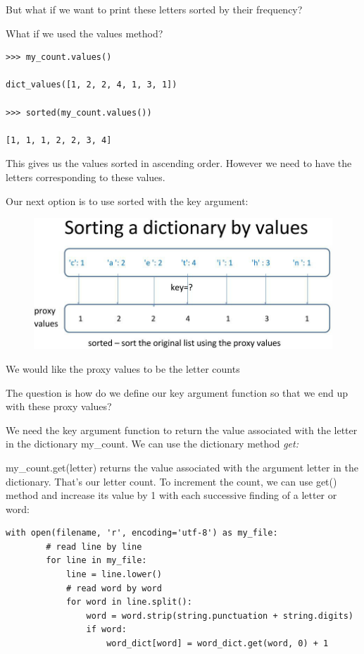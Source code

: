 \documentclass{article}
\begin{document}
But what if we want to print these letters sorted by their frequency?  

What if we used the values method?

\begin{lstlisting}
>>> my_count.values()

dict_values([1, 2, 2, 4, 1, 3, 1])

>>> sorted(my_count.values())

[1, 1, 1, 2, 2, 3, 4]
\end{lstlisting}

This gives us the values sorted in ascending order.  However we need to have the letters corresponding to these values.

Our next option is to use sorted with the key argument:

\begin{figure}[h]
\includegraphics[scale=.37]{sortingbyvalue}\\
\end{figure}

We would like  the proxy values to be the letter counts

The question is how do we define our key argument function so that we end up with these proxy values?

We need the key argument function to return the value associated with the letter in the dictionary my{\_}count.  We can use the dictionary method \textit{get:}

my{\_}count.get(letter) returns the value associated with the argument letter in the dictionary. That's our letter count. To increment the count, we can use get() method and increase its value by 1 with each successive finding of a letter or word:

\begin{lstlisting}
with open(filename, 'r', encoding='utf-8') as my_file:
        # read line by line
        for line in my_file:
            line = line.lower()
            # read word by word
            for word in line.split():
                word = word.strip(string.punctuation + string.digits)
                if word:
                    word_dict[word] = word_dict.get(word, 0) + 1
\end{lstlisting}
\end{document}
